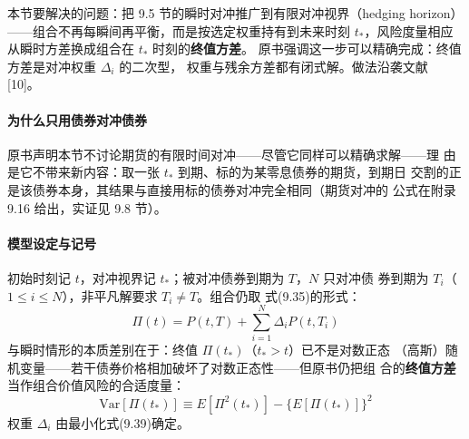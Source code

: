 本节要解决的问题：把 9.5 节的瞬时对冲推广到有限对冲视界（hedging
horizon）——组合不再每瞬间再平衡，而是按选定权重持有到未来时刻
$t_*$，风险度量相应从瞬时方差换成组合在 $t_*$ 时刻的\textbf{终值方差}。
原书强调这一步可以精确完成：终值方差是对冲权重 $\Delta_i$ 的二次型，
权重与残余方差都有闭式解。做法沿袭文献 [10]。

\paragraph{为什么只用债券对冲债券}
原书声明本节不讨论期货的有限时间对冲——尽管它同样可以精确求解——理
由是它不带来新内容：取一张 $t_*$ 到期、标的为某零息债券的期货，到期日
交割的正是该债券本身，其结果与直接用标的债券对冲完全相同（期货对冲的
公式在附录 9.16 给出，实证见 9.8 节）。

\paragraph{模型设定与记号}
初始时刻记 $t$，对冲视界记 $t_*$；被对冲债券到期为 $T$，$N$ 只对冲债
券到期为 $T_i$（$1\le i\le N$），非平凡解要求 $T_i\neq T$。组合仍取
式(9.35)的形式：
\begin{equation*}
\Pi(t)=P(t,T)+\sum_{i=1}^{N}\Delta_iP(t,T_i)\tag{9.38}
\end{equation*}
与瞬时情形的本质差别在于：终值 $\Pi(t_*)$（$t_*>t$）已不是对数正态
（高斯）随机变量——若干债券价格相加破坏了对数正态性——但原书仍把组
合的\textbf{终值方差}当作组合价值风险的合适度量：
\begin{equation*}
\mathrm{Var}[\Pi(t_*)]\equiv E[\Pi^2(t_*)]-\bigl\{E[\Pi(t_*)]\bigr\}^2
\tag{9.39}
\end{equation*}
权重 $\Delta_i$ 由最小化式(9.39)确定。

